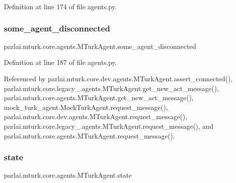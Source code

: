 Definition at line 174 of file agents.\+py.

\mbox{\label{classparlai_1_1mturk_1_1core_1_1agents_1_1MTurkAgent_a366ba925ed5b785fb44cbfe4a47e6739}} 
\subsubsection{\texorpdfstring{some\+\_\+agent\+\_\+disconnected}{some\_agent\_disconnected}}
{\footnotesize\ttfamily parlai.\+mturk.\+core.\+agents.\+M\+Turk\+Agent.\+some\+\_\+agent\+\_\+disconnected}



Definition at line 187 of file agents.\+py.



Referenced by parlai.\+mturk.\+core.\+dev.\+agents.\+M\+Turk\+Agent.\+assert\+\_\+connected(), parlai.\+mturk.\+core.\+legacy\+\_.\+agents.\+M\+Turk\+Agent.\+get\+\_\+new\+\_\+act\+\_\+message(), parlai.\+mturk.\+core.\+agents.\+M\+Turk\+Agent.\+get\+\_\+new\+\_\+act\+\_\+message(), mock\+\_\+turk\+\_\+agent.\+Mock\+Turk\+Agent.\+request\+\_\+message(), parlai.\+mturk.\+core.\+dev.\+agents.\+M\+Turk\+Agent.\+request\+\_\+message(), parlai.\+mturk.\+core.\+legacy\+\_.\+agents.\+M\+Turk\+Agent.\+request\+\_\+message(), and parlai.\+mturk.\+core.\+agents.\+M\+Turk\+Agent.\+request\+\_\+message().

\mbox{\label{classparlai_1_1mturk_1_1core_1_1agents_1_1MTurkAgent_aa07fbe6a898e37332826c2d414539a34}} 
\subsubsection{\texorpdfstring{state}{state}}
{\footnotesize\ttfamily parlai.\+mturk.\+core.\+agents.\+M\+Turk\+Agent.\+state}




